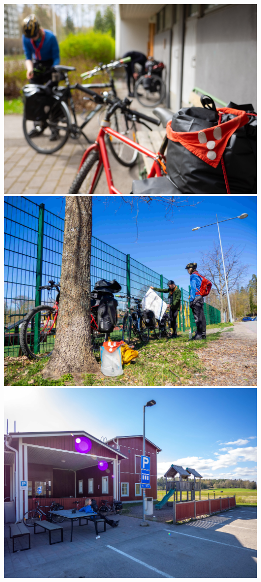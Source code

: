 \documentclass[10pt,finnish,a5paper,headings=small,twoside=semi]{scrartcl}
\begin{document}
\begin{multicols}{2}


	\begin{center}
		\noindent\includegraphics[width=0.94\linewidth]{assets/pyörävaellus1}
		\noindent\includegraphics[width=0.94\linewidth]{assets/pyörävaellus3}
		\noindent\includegraphics[width=0.94\linewidth]{assets/pyörävaellus4}

\end{center}
\end{multicols}
\end{document}
